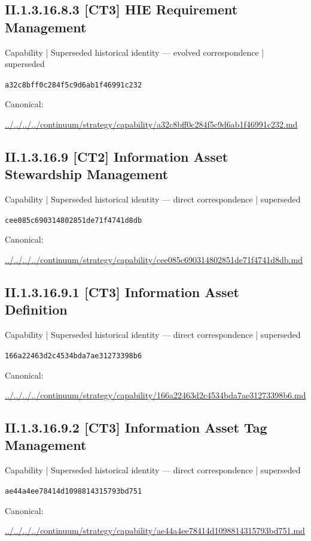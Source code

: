 \documentclass[10pt,a4paper]{article}
\begin{document}
\subsection*{II.1.3.16.8.3 [CT3] HIE Requirement Management}
{\small Capability | Superseded historical identity — evolved correspondence | superseded}\par
\texttt{a32c8bff0c284f5c9d6ab1f46991c232}\par
Canonical: \par
{\footnotesize\url{../../../../continuum/strategy/capability/a32c8bff0c284f5c9d6ab1f46991c232.md}}\par
\subsection*{II.1.3.16.9 [CT2] Information Asset Stewardship Management}
{\small Capability | Superseded historical identity — direct correspondence | superseded}\par
\texttt{cee085c690314802851de71f4741d8db}\par
Canonical: \par
{\footnotesize\url{../../../../continuum/strategy/capability/cee085c690314802851de71f4741d8db.md}}\par
\subsection*{II.1.3.16.9.1 [CT3] Information Asset Definition}
{\small Capability | Superseded historical identity — direct correspondence | superseded}\par
\texttt{166a22463d2c4534bda7ae31273398b6}\par
Canonical: \par
{\footnotesize\url{../../../../continuum/strategy/capability/166a22463d2c4534bda7ae31273398b6.md}}\par
\subsection*{II.1.3.16.9.2 [CT3] Information Asset Tag Management}
{\small Capability | Superseded historical identity — direct correspondence | superseded}\par
\texttt{ae44a4ee78414d1098814315793bd751}\par
Canonical: \par
{\footnotesize\url{../../../../continuum/strategy/capability/ae44a4ee78414d1098814315793bd751.md}}\par
\end{document}
